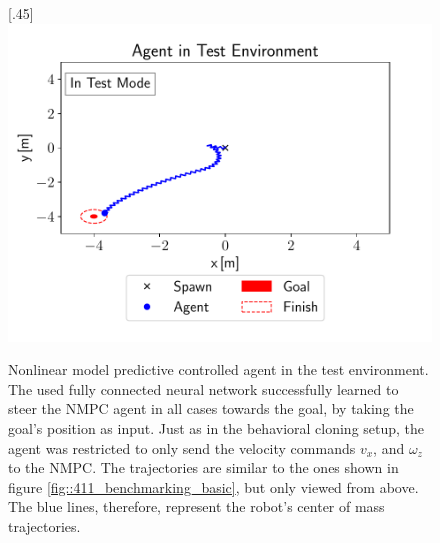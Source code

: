 \begin{figure}[h!]
	\subcaptionbox{}%
	[.45\linewidth]{\includegraphics[scale=.45]{chapters/04_experiments/02_autonomous_walking/test_mode_m4_m4.pdf}}
	\caption{Nonlinear model predictive controlled agent in the test environment. The used fully connected neural network successfully learned to steer the NMPC agent in all cases towards the goal, by taking the goal's position as input. Just as in the behavioral cloning setup, the agent was restricted to only send the velocity commands $v_x$, and $\omega_z$ to the NMPC. The trajectories are similar to the ones shown in figure \ref{fig::411_benchmarking_basic}, but only viewed from above. The blue lines, therefore, represent the robot's center of mass trajectories.}	
	\label{fig::432_nmpc_ppo_env}
\end{figure} 
